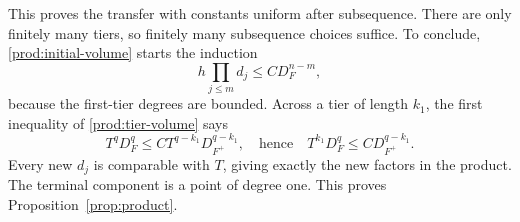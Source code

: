 This proves the transfer with constants uniform after subsequence.
There are only finitely many tiers, so finitely many subsequence choices
suffice.  To conclude, \eqref{prod:initial-volume} starts the induction
\[
 h\prod_{j\leq m}d_j\leq C D_F^{n-m},
\]
because the first-tier degrees are bounded.  Across a tier of length
$k_1$, the first inequality of \eqref{prod:tier-volume} says
\[
 T^qD_F^q\leq CT^{q-k_1}D_{F^+}^{q-k_1},
 \quad\text{hence}\quad
 T^{k_1}D_F^q\leq CD_{F^+}^{q-k_1}.
\]
Every new $d_j$ is comparable with $T$, giving exactly the new factors
in the product.  The terminal component is a point of degree one.
This proves Proposition~\ref{prop:product}.

